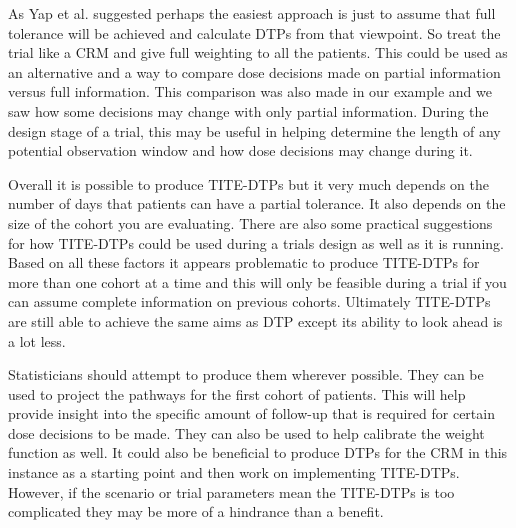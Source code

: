 As Yap et al. \cite{yapDoseTransitionPathways2017} suggested perhaps the easiest approach is just to assume that full tolerance will be achieved and calculate DTPs from that viewpoint. So treat the trial like a CRM and give full weighting to all the patients. This could be used as an alternative and a way to compare dose decisions made on partial information versus full information. This comparison was also made in our example and we saw how some decisions may change with only partial information. During the design stage of a trial, this may be useful in helping determine the length of any potential observation window and how dose decisions may change during it.  

Overall it is possible to produce TITE-DTPs but it very much depends on the number of days that patients can have a partial tolerance. It also depends on the size of the cohort you are evaluating. There are also some practical suggestions for how TITE-DTPs could be used during a trials design as well as it is running. Based on all these factors it appears problematic to produce TITE-DTPs for more than one cohort at a time and this will only be feasible during a trial if you can assume complete information on previous cohorts. Ultimately TITE-DTPs are still able to achieve the same aims as DTP except its ability to look ahead is a lot less. 

Statisticians should attempt to produce them wherever possible. They can be used to project the pathways for the first cohort of patients. This will help provide insight into the specific amount of follow-up that is required for certain dose decisions to be made. They can also be used to help calibrate the weight function as well. It could also be beneficial to produce DTPs for the CRM in this instance as a starting point and then work on implementing TITE-DTPs. However, if the scenario or trial parameters mean the TITE-DTPs is too complicated they may be more of a hindrance than a benefit. 